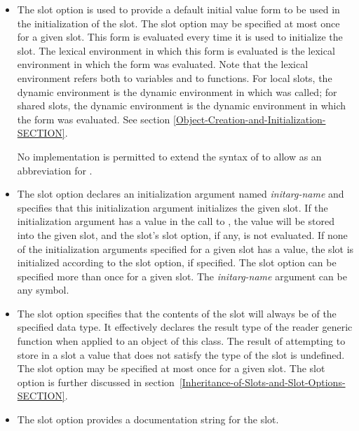 \begin{defmac}
\begin{itemize}
\item  The  slot option is used to provide a default
initial value form to be used in the initialization of the slot.  The
 slot option may be specified at most once for a given
slot.  This form is evaluated every time it is used to initialize the
slot.  The lexical
environment in which this form is evaluated is the lexical environment
in which the  form was evaluated.  Note that the lexical
environment refers both to variables and to functions.  For local
slots, the dynamic environment is the dynamic environment in which
 was called; for shared slots, the dynamic
environment is the dynamic environment in which the 
form was evaluated.  See section \ref{Object-Creation-and-Initialization-SECTION}.

No implementation is permitted to extend the syntax of 
to allow  as an abbreviation for 
.

\item 
The  slot option declares an initialization argument
named \emph{initarg-name\/} and specifies that this initialization argument
initializes the given slot.  If the initialization argument has a
value in the call to , the value will be
stored into the given slot, and the slot's  slot option, if
any, is not evaluated.  If none of the initialization arguments
specified for a given slot has a value, the slot is initialized
according to the  slot option, if specified.  The 
 slot option can be specified more than once for a given
slot.  The \emph{initarg-name\/} argument can be any symbol.

\item 
The  slot option specifies that the contents of the slot
will always be of the specified data type.  It effectively declares
the result type of the reader generic function when applied to an
object of this class.  The result of attempting to store in a slot a
value that does not satisfy the type of the slot is undefined.  The
 slot option may be specified at most once for a given
slot.  The  slot option is further discussed in
section~\ref{Inheritance-of-Slots-and-Slot-Options-SECTION}.

\item 
The  slot option provides a documentation string
for the slot.
\end{itemize}


\end{defmac}
